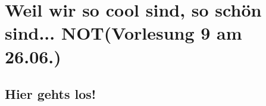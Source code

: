 \section{ Weil wir so cool sind, so schön sind... NOT\tiny (Vorlesung 9 am 26.06.)}
\subsection{Hier gehts los!}
